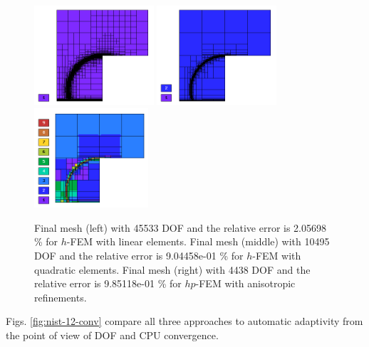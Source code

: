 \documentclass[12pt]{elsarticle}
\begin{document}
\begin{figure}[H]
\centering
\includegraphics[height=3.7cm]{nist/nist-12/mesh_h1_aniso.png}
\includegraphics[height=3.7cm]{nist/nist-12/mesh_h2_aniso.png}
\includegraphics[height=3.7cm]{nist/nist-12/mesh_hp_aniso.png}
\caption{
Final mesh (left) with 45533 DOF and the relative error is 2.05698 \% for $h$-FEM with linear elements.
Final mesh (middle) with 10495 DOF and the relative error is 9.04458e-01 \% for $h$-FEM with quadratic elements.
Final mesh (right) with 4438 DOF and the relative error is 9.85118e-01 \% for $hp$-FEM with anisotropic refinements.}
\label{fig:nist-12-hp-aniso}
\end{figure}

Figs. \ref{fig:nist-12-conv} compare all
three approaches to automatic adaptivity from the point
of view of DOF and CPU convergence.
\end{document}
